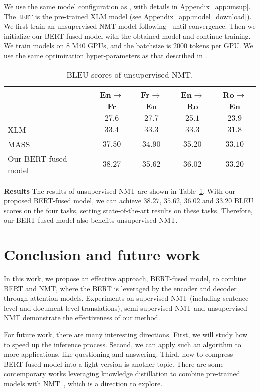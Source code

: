 \documentclass{article} \usepackage{iclr2020_conference,times}
\newcommand{\bert}{\texttt{BERT}}
\begin{document}
We use the same model configuration as \cite{lample2019cross}, with details in Appendix~\ref{app:unsup}. The $\bert$ is  the pre-trained XLM model (see Appendix~\ref{app:model_download}). We first train an unsupervised NMT model following~\citet{lample2019cross} until convergence. Then we initialize our BERT-fused  model with the obtained model and continue training. We train models on 8 M40 GPUs, and the batchsize is $2000$ tokens per GPU. We use the same optimization hyper-parameters as that described in \citet{lample2019cross}.




\begin{table}[!htbp]
\centering
\caption{BLEU scores of unsupervised NMT.}
\begin{tabular}{lcccc}
\toprule
& En$\to$Fr & Fr$\to$En & En$\to$Ro & Ro$\to$En \\
\midrule
\citet{lample2018phrase} & $27.6$&$27.7$& $25.1$& $23.9$\\
XLM~\citep{lample2019cross} & $33.4$ & $33.3$ &$33.3$&$31.8$\\
MASS~\citep{song2019mass} & $37.50$ & $34.90$ & $35.20$ & $33.10$ \\
Our BERT-fused model& $38.27$ & $35.62$  & $36.02$ & $33.20$\\
\bottomrule
\end{tabular}
\label{tab:results_unmt}
\end{table}


\noindent\textbf{Results} The results of unsupervised NMT are shown in Table~\ref{tab:results_unmt}.
With our proposed BERT-fused model, we can achieve $38.27$, $35.62$, $36.02$ and $33.20$ BLEU scores on the four tasks, setting state-of-the-art results on these tasks. Therefore,  our BERT-fused model also benefits unsupervised NMT. 

\section{Conclusion and future work}\label{sec:conc}
In this work, we propose an effective approach, BERT-fused model, to combine BERT and NMT, where the BERT is leveraged by the encoder and decoder through attention models. Experiments on supervised NMT (including sentence-level and document-level translations), semi-supervised NMT and unsupervised NMT demonstrate the effectiveness of our method. 

For future work, there are many interesting directions. First, we will study how to speed up the inference process. Second, we can apply such an algorithm to more applications, like questioning and answering. Third, how to compress BERT-fused model into a light version is another  topic. There are some contemporary works leveraging knowledge distillation to combine pre-trained models with NMT~\citep{yang2019towards,chen2019distilling}, which is a direction to explore.
\end{document}
